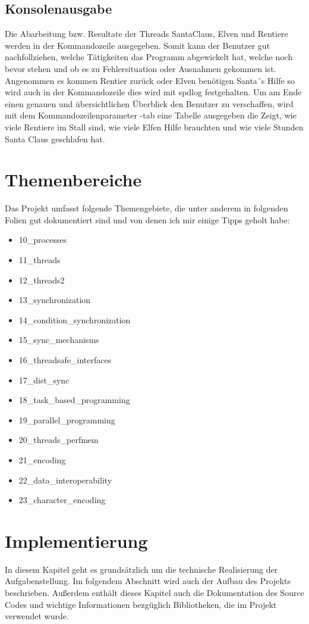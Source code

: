 \documentclass[a4paper,12pt]{article}
\begin{document}
\subsection{Konsolenausgabe}
Die Abarbeitung bzw. Resultate der Threads SantaClaus, Elven und Rentiere werden in der Kommandozeile ausgegeben. Somit kann der Benutzer gut nachfollziehen, welche Tätigkeiten das Programm abgewickelt hat, welche noch bevor stehen und
ob es zu Fehlersituation oder Ausnahmen gekommen ist. Angenommen es kommen Rentier zurück oder Elven benötigen Santa´s Hilfe so wird auch in der Kommandozeile dies wird mit spdlog festgehalten. Um am Ende einen genauen und übersichtlichen 
Überblick den Benutzer zu verschaffen, wird mit dem Kommandozeilenparameter -tab eine Tabelle ausgegeben die Zeigt, wie viele Rentiere im Stall sind, wie viele Elfen Hilfe brauchten und wie viele Stunden Santa Claus geschlafen hat.
\newpage
\section{Themenbereiche}
Das Projekt umfasst folgende Themengebiete, die unter anderem in folgenden Folien gut dokumentiert sind und von denen ich mir einige Tipps geholt habe:
    \begin{itemize}
        \item  10\_processes
        \item  11\_threads
        \item  12\_threads2 
        \item  13\_synchronization 
        \item  14\_condition\_synchronization 
        \item  15\_sync\_mechanisms 
        \item  16\_threadsafe\_interfaces 
        \item  17\_dist\_sync 
        \item  18\_task\_based\_programming 
        \item  19\_parallel\_programming 
        \item  20\_threads\_perfmem
        \item  21\_encoding
        \item  22\_data\_interoperability
        \item  23\_character\_encoding
    \end{itemize} 
\newpage
\section{Implementierung}
In diesem Kapitel geht es grundsätzlich um die technische Realisierung der Aufgabenstellung. Im folgendem Abschnitt wird auch
der Aufbau des Projekts beschrieben. Außerdem enthält dieses Kapitel auch die Dokumentation des Source Codes und wichtige Informationen bezgüglich Bibliotheken, 
die im Projekt verwendet wurde. 
\end{document}
